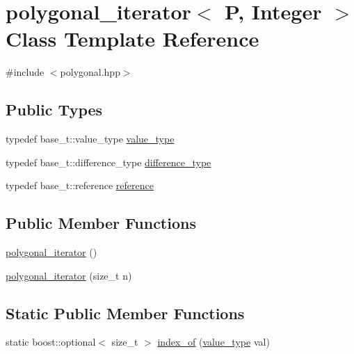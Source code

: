 \hypertarget{classyuh_1_1range__detail_1_1polygonal__iterator}{\section{polygonal\-\_\-iterator$<$ \-P, \-Integer $>$ \-Class \-Template \-Reference}
\label{d9/d0c/classyuh_1_1range__detail_1_1polygonal__iterator}
}


{\ttfamily \#include $<$polygonal.\-hpp$>$}

\subsection*{\-Public \-Types}
\begin{DoxyCompactItemize}
\item 
typedef base\-\_\-t\-::value\-\_\-type \hyperlink{classyuh_1_1range__detail_1_1polygonal__iterator_ab7468d4ed49b58c84d6c1b71779fb43e}{value\-\_\-type}
\item 
typedef base\-\_\-t\-::difference\-\_\-type \hyperlink{classyuh_1_1range__detail_1_1polygonal__iterator_a9ac6039762e1b262cecb98589ffc1d75}{difference\-\_\-type}
\item 
typedef base\-\_\-t\-::reference \hyperlink{classyuh_1_1range__detail_1_1polygonal__iterator_aa5d67140d1557795cc6c30a2849d4e05}{reference}
\end{DoxyCompactItemize}
\subsection*{\-Public \-Member \-Functions}
\begin{DoxyCompactItemize}
\item 
\hyperlink{classyuh_1_1range__detail_1_1polygonal__iterator_ac2e7d0f52b31712f78a39832e3d1415a}{polygonal\-\_\-iterator} ()
\item 
\hyperlink{classyuh_1_1range__detail_1_1polygonal__iterator_a50238cb4e9e9f468a6e3e81b857df52e}{polygonal\-\_\-iterator} (size\-\_\-t n)
\end{DoxyCompactItemize}
\subsection*{\-Static \-Public \-Member \-Functions}
\begin{DoxyCompactItemize}
\item 
static boost\-::optional$<$ size\-\_\-t $>$ \hyperlink{classyuh_1_1range__detail_1_1polygonal__iterator_a44fa6142bea1b3aefbe6e588b9e06591}{index\-\_\-of} (\hyperlink{classyuh_1_1range__detail_1_1polygonal__iterator_ab7468d4ed49b58c84d6c1b71779fb43e}{value\-\_\-type} val)
\end{DoxyCompactItemize}
